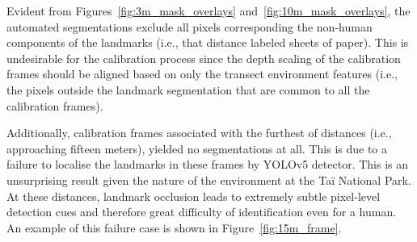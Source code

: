 %

Evident from Figures~\ref{fig:3m_mask_overlays} and~\ref{fig:10m_mask_overlays}, the
automated segmentations exclude all pixels corresponding the non-human components of the
landmarks (i.e., that distance labeled sheets of paper).
This is undesirable for the calibration process since the depth scaling of the calibration
frames should be aligned based on only the transect environment features (i.e., the pixels
outside the landmark segmentation that are common to all the calibration frames).

Additionally, calibration frames associated with the furthest of distances (i.e., approaching
fifteen meters), yielded no segmentations at all.
This is due to a failure to localise the landmarks in these frames by YOLOv5 detector.
This is an unsurprising result given the nature of the environment at the Taï National Park.
At these distances, landmark occlusion leads to extremely subtle pixel-level detection cues
and therefore great difficulty of identification even for a human.
An example of this failure case is shown in Figure~\ref{fig:15m_frame}.

